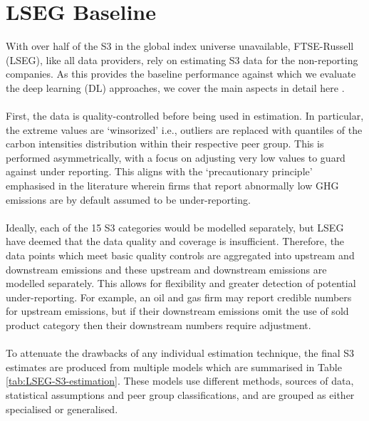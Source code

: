 \documentclass[12pt,twoside]{report}
\begin{document}
\section{LSEG Baseline}
With over half of the S3 in the global index universe unavailable, FTSE-Russell (LSEG), like all data providers, rely on estimating S3 data for the non-reporting companies. As this provides the baseline performance against which we evaluate the deep learning (DL) approaches, we cover the main aspects in detail here \cite{ftserussell2024}.
\\\\
First, the data is quality-controlled before being used in estimation. In particular, the extreme values are `winsorized' i.e., outliers are replaced with quantiles of the carbon intensities distribution within their respective peer group. This is performed asymmetrically, with a focus on adjusting very low values to guard against under reporting. This aligns with the `precautionary principle' emphasised in the literature \cite{Hoepner2021, olesiewicz2023} wherein firms that report abnormally low GHG emissions are by default assumed to be under-reporting.
\\\\
Ideally, each of the 15 S3 categories would be modelled separately, but LSEG have deemed that the data quality and coverage is insufficient. Therefore, the data points which meet basic quality controls are aggregated into upstream and downstream emissions and these upstream and downstream emissions are modelled separately. This allows for flexibility and greater detection of potential under-reporting. For example, an oil and gas firm may report credible numbers for upstream emissions, but if their downstream emissions omit the use of sold product category then their downstream numbers require adjustment. 
\\\\
To attenuate the drawbacks of any individual estimation technique, the final S3 estimates are produced from multiple models which are summarised in Table \ref{tab:LSEG-S3-estimation}. These models use different methods, sources of data, statistical assumptions and peer group classifications, and are grouped as either specialised or generalised. 
\end{document}
